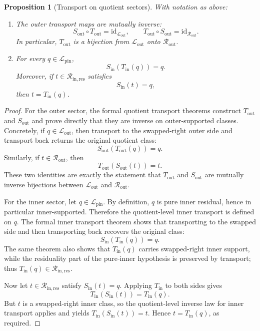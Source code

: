 \documentclass[11pt]{article}
\newtheorem{proposition}[theorem]{Proposition}
\begin{document}
\begin{proposition}[Transport on quotient sectors]
With notation as above:
\begin{enumerate}[label=\textup{(\roman*)}]
\item The outer transport maps are mutually inverse:
\[
S_{\mathrm{out}}\circ T_{\mathrm{out}}=\mathrm{id}_{\mathcal L_{\mathrm{out}}},
\qquad
T_{\mathrm{out}}\circ S_{\mathrm{out}}=\mathrm{id}_{\mathcal R_{\mathrm{out}}}.
\]
In particular, \(T_{\mathrm{out}}\) is a bijection from
\(\mathcal L_{\mathrm{out}}\) onto \(\mathcal R_{\mathrm{out}}\).
\item For every \(q\in \mathcal L_{\mathrm{pin}}\),
\[
S_{\mathrm{in}}(T_{\mathrm{in}}(q))=q.
\]
Moreover, if \(t\in \mathcal R_{\mathrm{in,res}}\) satisfies
\[
S_{\mathrm{in}}(t)=q,
\]
then \(t=T_{\mathrm{in}}(q)\).
\end{enumerate}
\end{proposition}

\begin{proof}
For the outer sector, the formal quotient transport theorems construct
\(T_{\mathrm{out}}\) and \(S_{\mathrm{out}}\) and prove directly that they are
inverse on outer-supported classes. Concretely, if
\(q\in \mathcal L_{\mathrm{out}}\), then transport to the swapped-right outer
side and transport back returns the original quotient class:
\[
S_{\mathrm{out}}(T_{\mathrm{out}}(q))=q.
\]
Similarly, if \(t\in \mathcal R_{\mathrm{out}}\), then
\[
T_{\mathrm{out}}(S_{\mathrm{out}}(t))=t.
\]
These two identities are exactly the statement that \(T_{\mathrm{out}}\) and
\(S_{\mathrm{out}}\) are mutually inverse bijections between
\(\mathcal L_{\mathrm{out}}\) and \(\mathcal R_{\mathrm{out}}\).

For the inner sector, let \(q\in \mathcal L_{\mathrm{pin}}\). By definition,
\(q\) is pure inner residual, hence in particular inner-supported. Therefore the
quotient-level inner transport is defined on \(q\). The formal inner transport
theorem shows that transporting to the swapped side and then transporting back
recovers the original class:
\[
S_{\mathrm{in}}(T_{\mathrm{in}}(q))=q.
\]
The same theorem also shows that \(T_{\mathrm{in}}(q)\) carries swapped-right
inner support, while the residuality part of the pure-inner hypothesis is
preserved by transport; thus \(T_{\mathrm{in}}(q)\in \mathcal R_{\mathrm{in,res}}\).

Now let \(t\in \mathcal R_{\mathrm{in,res}}\) satisfy \(S_{\mathrm{in}}(t)=q\).
Applying \(T_{\mathrm{in}}\) to both sides gives
\[
T_{\mathrm{in}}(S_{\mathrm{in}}(t))=T_{\mathrm{in}}(q).
\]
But \(t\) is a swapped-right inner class, so the quotient-level inverse law for
inner transport applies and yields \(T_{\mathrm{in}}(S_{\mathrm{in}}(t))=t\).
Hence \(t=T_{\mathrm{in}}(q)\), as required.
\end{proof}
\end{document}
